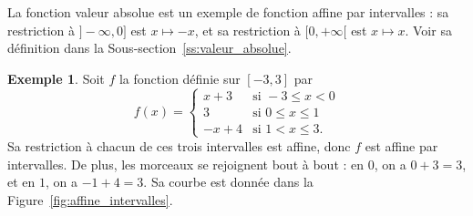\documentclass[12pt,a4paper]{article}
\theoremstyle{plain}
\theoremstyle{definition}
\newtheorem{example}[theorem]{Exemple}
\theoremstyle{remark}
\begin{document}
La fonction valeur absolue est un exemple de fonction affine par intervalles : sa
restriction à $]-\infty, 0]$ est $x \mapsto -x$, et sa restriction à $[0, +\infty[$
est $x \mapsto x$. Voir sa définition dans la Sous-section~\ref{ss:valeur_absolue}.

\noindent
\begin{minipage}[c]{0.52\linewidth}
  \begin{example}
    Soit $f$ la fonction définie sur $[-3, 3]$ par
    \[
    f(x) =
    \begin{cases}
      x + 3 & \text{si } -3 \le x < 0 \\
      3 & \text{si } 0 \le x \le 1 \\
      -x + 4 & \text{si } 1 < x \le 3.
    \end{cases}
    \]
    Sa restriction à chacun de ces trois intervalles est affine, donc $f$ est
    affine par intervalles. De plus, les morceaux se rejoignent bout à bout :
    en $0$, on a $0 + 3 = 3$, et en $1$, on a $-1 + 4 = 3$. Sa courbe est
    donnée dans la Figure~\ref{fig:affine_intervalles}.
  \end{example}
\end{minipage}\hfill
\begin{minipage}[c]{0.4\linewidth}
  \captionsetup{hypcap=false, skip=12pt}
  
  \begin{minipage}[c][6cm][c]{\linewidth}
    \centering
  \end{minipage}
  
  \label{fig:affine_intervalles}
\end{minipage}
\par
\vspace{0.5em}
\end{document}
